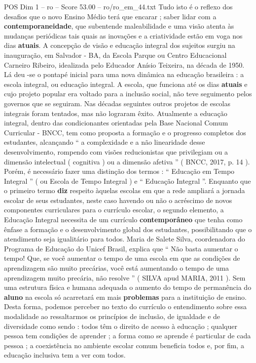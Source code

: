 \begin{textsample}{POS Dim 1 – ro – Score 53.00 – ro/ro\_em\_44.txt}
Tudo isto é o reflexo dos desafios que o novo Ensino Médio terá que encarar ; saber lidar com a \textbf{contemporaneidade}, que subentende maleabilidade e uma visão atenta às mudanças periódicas tais quais as inovações e a criatividade estão em voga nos dias \textbf{atuais}.
A concepção de visão e educação integral dos sujeitos surgiu na inauguração, em Salvador - BA, da Escola Parque ou Centro Educacional Carneiro Ribeiro, idealizada pelo Educador Anísio Teixeira, na década de 1950.
Lá deu -se o pontapé inicial para uma nova dinâmica na educação brasileira : a escola integral, ou educação integral.
A escola, que funciona até os dias \textbf{atuais} e cujo projeto popular era voltado para a inclusão social, não teve seguimento pelos governos que se seguiram.
Nas décadas seguintes outros projetos de escolas integrais foram tentados, mas não lograram êxito.
Atualmente a educação integral, dentro das condicionantes orientadas pela Base Nacional Comum Curricular - BNCC, tem como proposta a formação e o progresso completos dos estudantes, alcançando “ a complexidade e a não linearidade desse desenvolvimento, rompendo com visões reducionistas que privilegiam ou a dimensão intelectual ( cognitiva ) ou a dimensão afetiva ” ( BNCC, 2017, p. 14 ).
Porém, é necessário fazer uma distinção dos termos : “ Educação em Tempo Integral ” ( ou Escola de Tempo Integral ) e “ Educação Integral ”.
Enquanto que o primeiro termo \textbf{diz} respeito àquelas escolas em que a rede ampliará a jornada escolar de seus estudantes, neste caso havendo ou não o acréscimo de novos componentes curriculares para o currículo escolar, o segundo elemento, a Educação Integral necessita de um currículo \textbf{contemporâneo} que tenha como ênfase a formação e o desenvolvimento global dos estudantes, possibilitando que o atendimento seja igualitário para todos.
Maria de Salete Silva, coordenadora do Programa de Educação do Unicef Brasil, explica que “ Não basta aumentar o tempo!
Que, se você aumentar o tempo de uma escola em que as condições de aprendizagem são muito precárias, você está aumentando o tempo de uma aprendizagem muito precária, não resolve ” ( SILVA apud MARIA, 2011 ).
Sem uma estrutura física e humana adequada o aumento do tempo de permanência do \textbf{aluno} na escola só acarretará em mais \textbf{problemas} para a instituição de ensino.
Desta forma, podemos perceber no texto do currículo o entendimento sobre essa modalidade ao ressaltarmos os princípios de inclusão, de igualdade e de diversidade como sendo : todos têm o direito de acesso à educação ; qualquer pessoa tem condições de aprender ; a forma como se aprende é particular de cada pessoa ; a coexistência no ambiente escolar comum beneficia todos e, por fim, a educação inclusiva tem a ver com todos.


\end{textsample}
